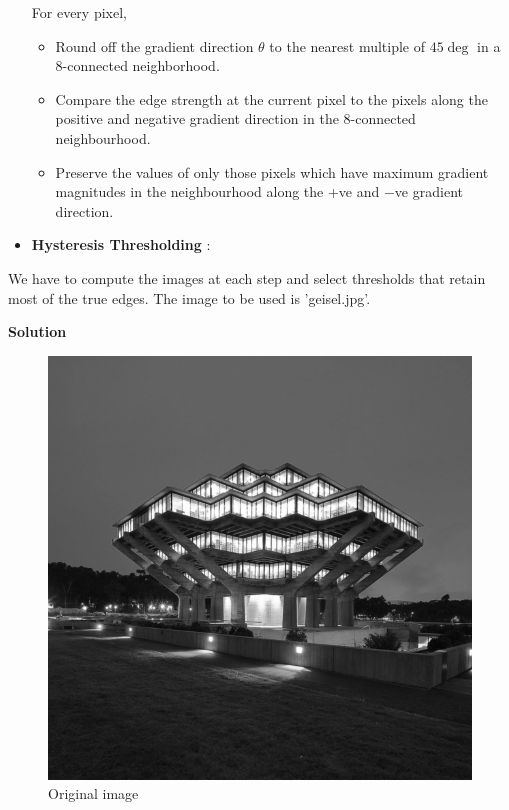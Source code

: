 \documentclass{assignment}
\begin{document}
\begin{problemlist}
\begin{itemize}
For every pixel,

\begin{itemize}

\item Round off the gradient direction $\theta$ to the nearest multiple of $45\deg$ in a 8-connected neighborhood. 

\item Compare the edge strength at the current pixel to the pixels along the positive and negative gradient direction in the 8-connected neighbourhood.

\item Preserve the values of only those pixels which have maximum gradient magnitudes in the neighbourhood along the +ve and −ve gradient direction.

\end{itemize}

\item \textbf{Hysteresis Thresholding} : 

\end{itemize}

We have to compute the images at each step and select thresholds that retain most of the true edges. The image to be used is 'geisel.jpg'.

\textbf{Solution}

\begin{figure}[H]
\centering
\includegraphics[width=0.3\columnwidth]{geisel}
\caption{Original image}
\label{fig:i5}
\end{figure}


\end{problemlist}
\end{document}
